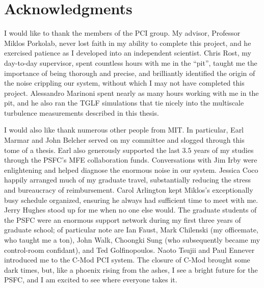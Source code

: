 \section*{Acknowledgments}
I would like to thank the members of the \diiid\space PCI group.
My advisor, Professor Miklos Porkolab,
never lost faith in my ability to complete this project, and
he exercised patience as I developed into an independent scientist.
Chris Rost, my day-to-day supervisor,
spent countless hours with me in the \diiid\space ``pit'',
taught me the importance of being thorough and precise, and
brilliantly identified the origin of the noise crippling our system,
without which I may not have completed this project.
Alessandro Marinoni spent nearly as many hours working with me in the pit, and
he also ran the TGLF simulations
that tie nicely into the multiscale turbulence measurements
described in this thesis.

I would also like thank numerous other people from MIT.
In particular, Earl Marmar and John Belcher
served on my committee and slogged through
this tome of a thesis.
Earl also generously supported the last $3.5$ years of my studies
through the PSFC's MFE collaboration funds.
Conversations with Jim Irby were enlightening and
helped diagnose the enormous noise in our system.
Jessica Coco happily arranged much of my graduate travel,
substantially reducing the stress and bureaucracy of reimbursement.
Carol Arlington kept Miklos's exceptionally busy schedule organized,
ensuring he always had sufficient time to meet with me.
Jerry Hughes stood up for me when no one else would.
The graduate students of the PSFC were an enormous support network
during my first three years of graduate school;
of particular note are
Ian Faust,
Mark Chilenski (my officemate, who taught me a ton),
John Walk,
Choongki Sung (who subsequently became my \diiid\space control-room confidant),
and Ted Golfinopoulos.
Naoto Tsujii and Paul Ennever introduced me to the C-Mod PCI system.
The closure of C-Mod brought some dark times, but,
like a phoenix rising from the ashes,
I see a bright future for the PSFC, and
I am excited to see where everyone takes it.

